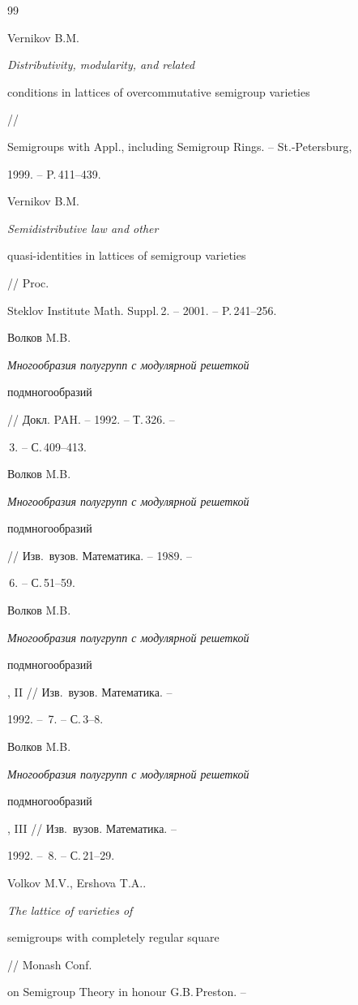 \begin{thebibliography}{99}







Vernikov B.M. {\em Distributivity, modularity, and related


conditions in lattices of overcommutative semigroup varieties} //


Semigroups with Appl., including Semigroup Rings. -- St.-Petersburg,


1999. -- P.\,411--439.




Vernikov B.M. {\em Semidistributive law and other


quasi-identities in lattices of semigroup varieties} // Proc.


Steklov Institute Math. Suppl.\,2. -- 2001. -- P.\,241--256.




Волков M.B. {\em Многообразия полугрупп с модулярной решеткой


подмногообразий} // Докл. PAH. -- 1992. -- Т.\,326. --


\No\,3. -- С.\,409--413.




Волков M.B. {\em Многообразия полугрупп с модулярной решеткой


подмногообразий} // Изв.\ вузов. Математика. -- 1989. --


\No\,6. -- С.\,51--59.




Волков M.B. {\em Многообразия полугрупп с модулярной решеткой


подмногообразий}, II // Изв.\ вузов. Математика. --


1992. -- \No\,7. -- С.\,3--8.




Волков M.B. {\em Многообразия полугрупп с модулярной решеткой


подмногообразий}, III // Изв.\ вузов. Математика. --


1992. -- \No\,8. -- С.\,21--29.




Volkov M.V., Ershova T.A.. {\em The lattice of varieties of


semigroups with completely regular square} // Monash Conf.\ 


on Semigroup Theory in honour G.B.\,Preston. --



\end{thebibliography}
